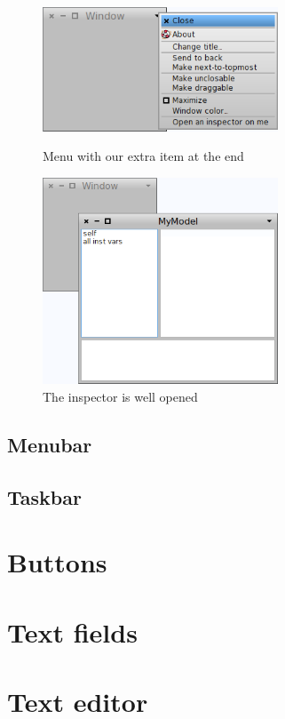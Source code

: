 \documentclass[a4paper,10pt,twoside]{book}
\begin{document}
\begin{figure}[ht]\centering
	\includegraphics[width=7cm]{MenuBar}
	\caption{Menu with our extra item at the end}
	\label{fig:menuBar}
	\includegraphics[width=7cm]{WindowAndInspector}
	\caption{The inspector is well opened}
	\label{fig:windowAndInspector}
\end{figure}

\subsection{Menubar}


\subsection{Taskbar}


\section{Buttons}

\section{Text fields}

\section{Text editor}
\end{document}
